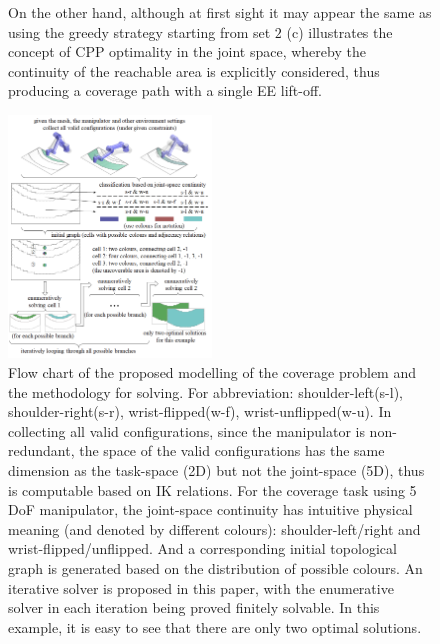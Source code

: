 \documentclass[journal]{IEEEtran}
\begin{document}
\begin{figure}[t]
{On the other hand, although at first sight it may appear the same as using the greedy strategy starting from set $2$ (c) illustrates the concept of CPP optimality in the joint space, whereby the continuity of the reachable area is explicitly considered, thus producing a coverage path with a single EE lift-off.} 
\label{fig1}
\end{figure}

\begin{figure}[t]
\centering
\includegraphics[width = 0.48\textwidth]{figures/other_figures/newflowchart}
\caption{Flow chart of the proposed modelling of the coverage problem and the methodology for solving. For abbreviation: shoulder-left(s-l), shoulder-right(s-r), wrist-flipped(w-f), wrist-unflipped(w-u). In collecting all valid configurations, since the manipulator is non-redundant, the space of the valid configurations has the same dimension as the task-space (2D) but not the joint-space (5D), thus is computable based on IK relations. For the coverage task using 5 DoF manipulator, the joint-space continuity has intuitive physical meaning (and denoted by different colours): shoulder-left/right and wrist-flipped/unflipped. And a corresponding initial topological graph is generated based on the distribution of possible colours. An iterative solver is proposed in this paper, with the enumerative solver in each iteration being proved finitely solvable. In this example, it is easy to see that there are only two optimal solutions. }\label{fignewflowchart}
\end{figure}
\end{document}
